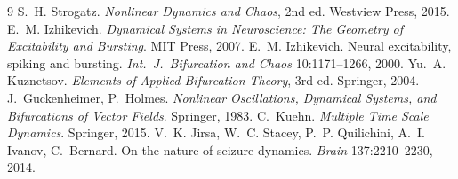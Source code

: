 \documentclass[11pt,openany]{report}
\begin{document}
\begin{thebibliography}{9}\small
{} S.~H. Strogatz. \emph{Nonlinear Dynamics and Chaos}, 2nd ed. Westview Press, 2015.
 E.~M. Izhikevich. \emph{Dynamical Systems in Neuroscience: The Geometry of Excitability and
Bursting}. MIT Press, 2007.
 E.~M. Izhikevich. Neural excitability, spiking and bursting. \emph{Int.\ J.\ Bifurcation and
Chaos} 10:1171--1266, 2000.
 Yu.~A. Kuznetsov. \emph{Elements of Applied Bifurcation Theory}, 3rd ed. Springer, 2004.
 J.~Guckenheimer, P.~Holmes. \emph{Nonlinear Oscillations, Dynamical Systems, and Bifurcations
of Vector Fields}. Springer, 1983.
 C.~Kuehn. \emph{Multiple Time Scale Dynamics}. Springer, 2015.
 V.~K. Jirsa, W.~C. Stacey, P.~P. Quilichini, A.~I. Ivanov, C.~Bernard. On the nature of seizure
dynamics. \emph{Brain} 137:2210--2230, 2014.
\end{thebibliography}
\end{document}
